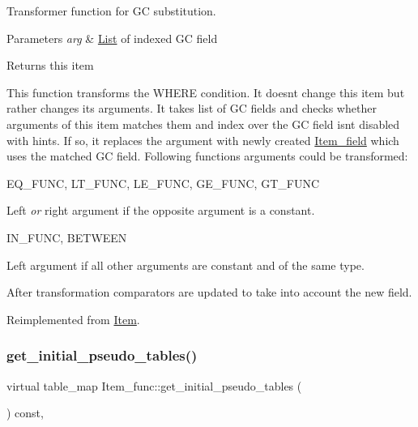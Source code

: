 Transformer function for GC substitution.


\begin{DoxyParams}{Parameters}
{\em arg} & \mbox{\hyperlink{classList}{List}} of indexed GC field\\
\hline
\end{DoxyParams}
\begin{DoxyReturn}{Returns}
this item
\end{DoxyReturn}
This function transforms the W\+H\+E\+RE condition. It doesn\textquotesingle{}t change \textquotesingle{}this\textquotesingle{} item but rather changes its arguments. It takes list of GC fields and checks whether arguments of \textquotesingle{}this\textquotesingle{} item matches them and index over the GC field isn\textquotesingle{}t disabled with hints. If so, it replaces the argument with newly created \mbox{\hyperlink{classItem__field}{Item\+\_\+field}} which uses the matched GC field. Following functions\textquotesingle{} arguments could be transformed\+:
\begin{DoxyItemize}
\item E\+Q\+\_\+\+F\+U\+NC, L\+T\+\_\+\+F\+U\+NC, L\+E\+\_\+\+F\+U\+NC, G\+E\+\_\+\+F\+U\+NC, G\+T\+\_\+\+F\+U\+NC
\begin{DoxyItemize}
\item Left {\itshape or} right argument if the opposite argument is a constant.
\end{DoxyItemize}
\item I\+N\+\_\+\+F\+U\+NC, B\+E\+T\+W\+E\+EN
\begin{DoxyItemize}
\item Left argument if all other arguments are constant and of the same type.
\end{DoxyItemize}
\end{DoxyItemize}

After transformation comparators are updated to take into account the new field. 

Reimplemented from \mbox{\hyperlink{classItem_a09908dd05d73b9ca1eda2ed8b00d87f4}{Item}}.

\mbox{\label{classItem__func_a379f54a79ca65beebc1e2571f3bf0d35}} 
\subsubsection{\texorpdfstring{get\+\_\+initial\+\_\+pseudo\+\_\+tables()}{get\_initial\_pseudo\_tables()}}
{\footnotesize\ttfamily virtual table\+\_\+map Item\+\_\+func\+::get\+\_\+initial\+\_\+pseudo\+\_\+tables (\begin{DoxyParamCaption}{ }\end{DoxyParamCaption}) const\hspace{0.3cm}{\ttfamily [inline]}, {\ttfamily [virtual]}}

